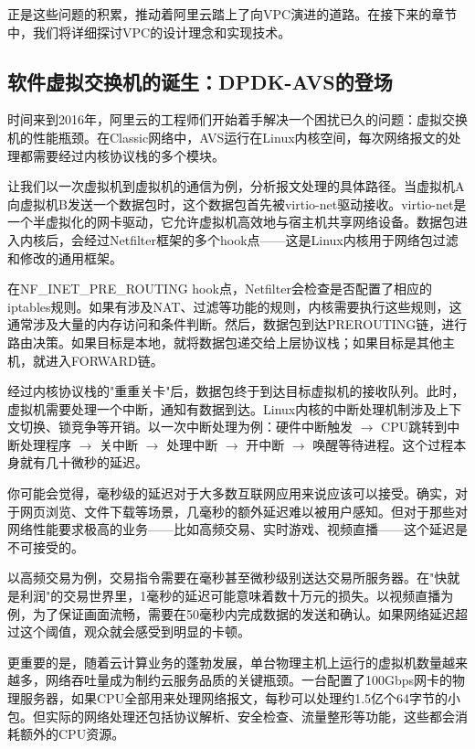 正是这些问题的积累，推动着阿里云踏上了向VPC演进的道路。在接下来的章节中，我们将详细探讨VPC的设计理念和实现技术。

\subsection{软件虚拟交换机的诞生：DPDK-AVS的登场}

时间来到2016年，阿里云的工程师们开始着手解决一个困扰已久的问题：虚拟交换机的性能瓶颈。在Classic网络中，AVS运行在Linux内核空间，每次网络报文的处理都需要经过内核协议栈的多个模块。

让我们以一次虚拟机到虚拟机的通信为例，分析报文处理的具体路径。当虚拟机A向虚拟机B发送一个数据包时，这个数据包首先被virtio-net驱动接收。virtio-net是一个半虚拟化的网卡驱动，它允许虚拟机高效地与宿主机共享网络设备。数据包进入内核后，会经过Netfilter框架的多个hook点——这是Linux内核用于网络包过滤和修改的通用框架。

在NF_INET_PRE_ROUTING hook点，Netfilter会检查是否配置了相应的iptables规则。如果有涉及NAT、过滤等功能的规则，内核需要执行这些规则，这通常涉及大量的内存访问和条件判断。然后，数据包到达PREROUTING链，进行路由决策。如果目标是本地，就将数据包递交给上层协议栈；如果目标是其他主机，就进入FORWARD链。

经过内核协议栈的"重重关卡"后，数据包终于到达目标虚拟机的接收队列。此时，虚拟机需要处理一个中断，通知有数据到达。Linux内核的中断处理机制涉及上下文切换、锁竞争等开销。以一次中断处理为例：硬件中断触发 $\rightarrow$ CPU跳转到中断处理程序 $\rightarrow$ 关中断 $\rightarrow$ 处理中断 $\rightarrow$ 开中断 $\rightarrow$ 唤醒等待进程。这个过程本身就有几十微秒的延迟。

你可能会觉得，毫秒级的延迟对于大多数互联网应用来说应该可以接受。确实，对于网页浏览、文件下载等场景，几毫秒的额外延迟难以被用户感知。但对于那些对网络性能要求极高的业务——比如高频交易、实时游戏、视频直播——这个延迟是不可接受的。

以高频交易为例，交易指令需要在毫秒甚至微秒级别送达交易所服务器。在"快就是利润"的交易世界里，1毫秒的延迟可能意味着数十万元的损失。以视频直播为例，为了保证画面流畅，需要在50毫秒内完成数据的发送和确认。如果网络延迟超过这个阈值，观众就会感受到明显的卡顿。

更重要的是，随着云计算业务的蓬勃发展，单台物理主机上运行的虚拟机数量越来越多，网络吞吐量成为制约云服务品质的关键瓶颈。一台配置了100Gbps网卡的物理服务器，如果CPU全部用来处理网络报文，每秒可以处理约1.5亿个64字节的小包。但实际的网络处理还包括协议解析、安全检查、流量整形等功能，这些都会消耗额外的CPU资源。

